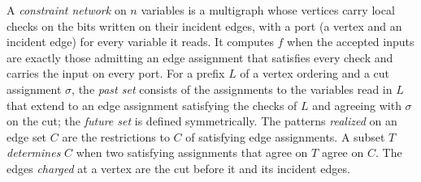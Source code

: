 \begin{definition}
  \label{def:lowerbounds-algebraic-network}
  \leanok
  A \emph{constraint network} on $n$ variables is a multigraph whose vertices
  carry local checks on the bits written on their incident edges, with a port
  (a vertex and an incident edge) for every variable it reads. It computes
  $f$ when the accepted inputs are exactly those admitting an edge assignment
  that satisfies every check and carries the input on every port. For a
  prefix $L$ of a vertex ordering and a cut assignment $\sigma$, the
  \emph{past set} consists of the assignments to the variables read in $L$
  that extend to an edge assignment satisfying the checks of $L$ and agreeing
  with $\sigma$ on the cut; the \emph{future set} is defined symmetrically.
  The patterns \emph{realized} on an edge set $C$ are the restrictions to $C$
  of satisfying edge assignments. A subset $T$ \emph{determines} $C$ when two
  satisfying assignments that agree on $T$ agree on $C$. The edges
  \emph{charged} at a vertex are the cut before it and its incident edges.
\end{definition}

